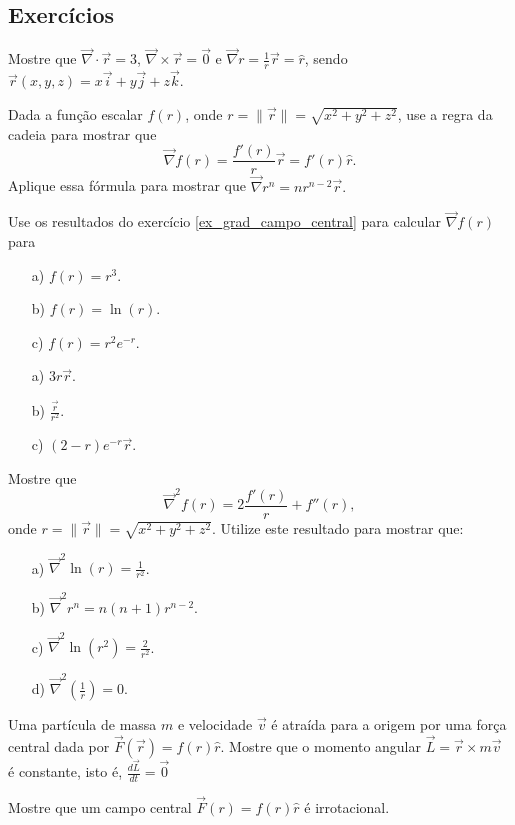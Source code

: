 \subsection*{Exercícios}
\begin{exer}
Mostre que $\vec{\nabla}\cdot\vec{r}=3$, $\vec{\nabla}\times\vec{r}=\vec{0}$ e $\vec{\nabla}r=\frac{1}{r}\vec{r}=\hat{r}$, sendo $\vec{r}(x,y,z)=x\vec{i}+y\vec{j}+z\vec{k}$.
\end{exer}
\begin{exer}\label{ex_grad_campo_central}
Dada a função escalar $f(r)$, onde $r=\|\vec{r}\|=\sqrt{x^2+y^2+z^2}$, use a regra da cadeia para mostrar que
$$
\vec{\nabla}f(r)=\frac{f'(r)}{r}\vec{r}=f'(r)\hat{r}.
$$
Aplique essa fórmula para mostrar que $\vec{\nabla}r^n=nr^{n-2}\vec{r}.$
\end{exer}
\begin{exer}Use os resultados do exercício \ref{ex_grad_campo_central} para calcular $\vec{\nabla}f(r)$ para
\begin{itemize}
 \item[a)] $f(r)=r^3$.
 \item[b)] $f(r)=\ln(r)$.
 \item[c)] $f(r)=r^2e^{-r}$.
\end{itemize}
\end{exer}
\begin{resp}
\begin{itemize}
 \item[a)] $3r\vec{r}$.
 \item[b)] $\frac{\vec{r}}{r^2}$.
 \item[c)] $(2-r)e^{-r}\vec{r}$.
\end{itemize}
\end{resp}
\begin{exer}
 Mostre que
 $$
 \vec{\nabla}^2f(r)=2\frac{f'(r)}{r}+f''(r),
 $$
 onde $r=\|\vec{r}\|=\sqrt{x^2+y^2+z^2}$. Utilize este resultado para mostrar que:
 \begin{itemize}
  \item[a)] $\vec{\nabla}^2\ln(r) =\frac{1}{r^2}$.
  \item[b)] $\vec{\nabla}^2r^n =n(n+1)r^{n-2}$.
  \item[c)] $\vec{\nabla}^2\ln(r^2) =\frac{2}{r^2}$.
    \item[d)] $\vec{\nabla}^2\left(\frac{1}{r}\right) =0$.
 \end{itemize}
\end{exer}

\begin{exer}
 Uma partícula de massa $m$ e velocidade $\vec{v}$ é atraída para a origem por uma força central dada por $\vec{F}(\vec{r})=f(r)\hat{r}$. Mostre que o momento angular $\vec{L}=\vec{r}\times m\vec{v}$ é constante, isto é, $\frac{d\vec{L}}{dt}=\vec{0}$
\end{exer}
\begin{exer}
 Mostre que um campo central $\vec{F}(r)=f(r)\hat{r}$ é irrotacional.
\end{exer}




